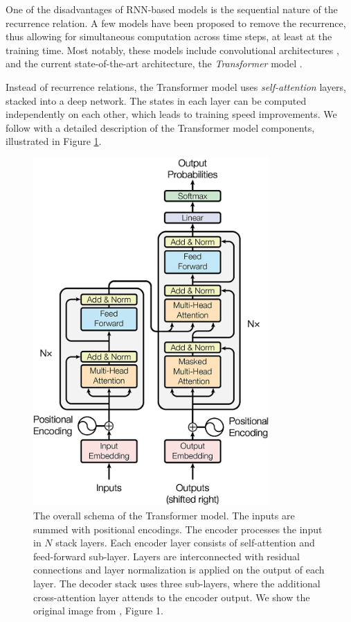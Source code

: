 One of the disadvantages of RNN-based models is the sequential nature of the
recurrence relation. A few models have been proposed to remove the recurrence,
thus allowing for simultaneous computation across time steps, at least at the
training time. Most notably, these models include convolutional architectures
\citep{gehring2017convolutional}, and the current state-of-the-art
architecture, the \emph{Transformer} model \citep{vaswani2017attention}.

Instead of recurrence relations, the Transformer model uses
\emph{self-attention} layers, stacked into a deep network. The states in each
layer can be computed independently on each other, which leads to training
speed improvements. We follow with a detailed description of the Transformer
model components, illustrated in Figure \ref{fig:transformer}.

\begin{figure}
  \centering
  \includegraphics[width=9cm]{img/transformer.png}

  \caption{The overall schema of the Transformer model. The inputs are summed
    with positional encodings. The encoder processes the input in $N$ stack
    layers. Each encoder layer consists of self-attention and feed-forward
    sub-layer. Layers are interconnected with residual connections and layer
    normalization is applied on the output of each layer. The decoder stack
    uses three sub-layers, where the additional cross-attention layer attends
    to the encoder output. We show the original image from
    \citet{vaswani2017attention}, Figure 1.}
  \label{fig:transformer}
\end{figure}

